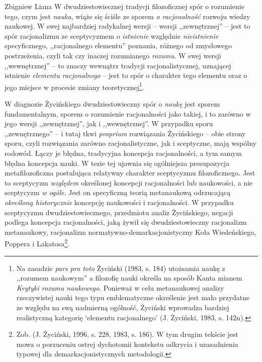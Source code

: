 \begin{artplenv}{Zbigniew Liana}
W dwudziestowiecznej tradycji filozoficznej spór o rozumienie tego, czym jest \textit{nauka}, wiąże się ściśle ze
sporem \textit{o racjonalność }rozwoju wiedzy naukowej. W swej najbardziej radykalnej wersji -- wersji ,,zewnętrznej'' --
jest to spór racjonalizmu ze sceptycyzmem o \textit{istnienie} względnie \textit{nieistnienie} specyficznego, ,,racjonalnego
elementu'' poznania, różnego od zmysłowego postrzeżenia, czyli tak czy inaczej rozumianego \textit{rozumu}. W swej wersji
,,wewnętrznej'' -- to znaczy wewnątrz tradycji racjonalistycznej, uznającej istnienie \textit{elementu racjonalnego} -- jest
to spór o charakter tego elementu oraz o jego miejsce w procesie zmiany teoretycznej\footnote{Na zasadzie \textit{pars
pro toto} Życiński \label{ref:RND1yjaBGa3S8}(1983, s. 184) utożsamia naukę z ,,rozumem naukowym'' a filozofię nauki
określa na sposób Kanta mianem \textit{Krytyki rozumu naukowego}. Ponieważ w celu metanaukowej analizy rzeczywistej nauki
tego typu emblematyczne określenie jest mało przydatne ze względu na swą nadmierną ogólność, Życiński wprowadza
bardziej realistyczną kategorię `elementu racjonalnego' \label{ref:RNDZsYVuB7lRL}(J. Życiński, 1983, s. 142n).}.

W diagnozie Życińskiego dwudziestowieczny spór o \textit{naukę} jest sporem fundamentalnym, sporem o rozumienie
racjonalności jako takiej, i to zarówno w jego wersji ,,zewnętrznej'', jak i ,,wewnętrznej''. W przypadku sporu
,,zewnętrznego'' -- i tutaj tkwi \textit{proprium} rozwiązania Życińskiego -- obie strony sporu, czyli rozwiązania zarówno
racjonalistyczne, jak i sceptyczne, mają wspólny rodowód. Łączy je błędna, tradycyjna koncepcja racjonalności, a tym
samym błędna koncepcja nauki. W tezie tej ujawnia się ogólniejsza presupozycja metafilozoficzna postulująca relatywny
charakter sceptycyzmu filozoficznego. Jest to sceptycyzm \textit{względem} określonej koncepcji racjonalności lub
naukowości, a nie sceptycyzm \textit{w ogóle}. Jest on specyficzną teorią metanaukową odrzucającą \textit{określoną
historycznie} koncepcję naukowości i racjonalności. W przypadku sceptycyzmu dwudziestowiecznego, przedmiotu analiz
Życińskiego, negacji podlega koncepcja racjonalności, jaką żywił się dwudziestowieczny racjonalizm metanaukowy,
racjonalizm normatywno-demarkacjonistyczny Koła Wiedeńskiego, Poppera i Lakatosa\footnote{Zob.
\label{ref:RNDM0IkZEEMNb}(J. Życiński, 1996, s. 228, 1983, s. 186). W tym drugim tekście jest mowa o porzuceniu ostrej
dychotomii kontekstu odkrycia i uzasadnienia typowej dla demarkacjonistycznych metodologii.}.


\end{artplenv}
